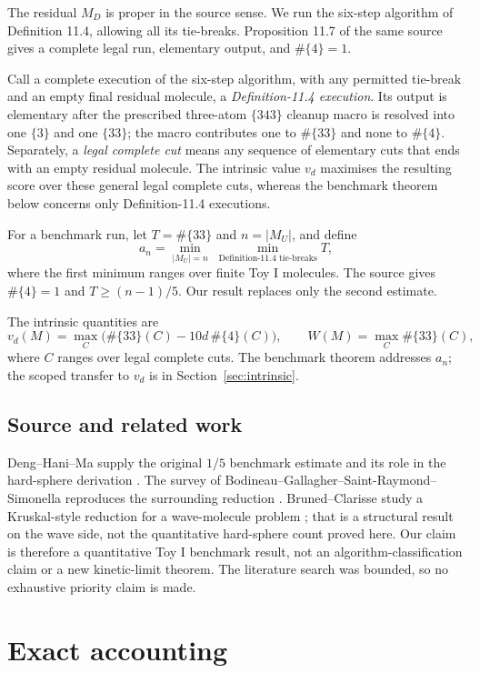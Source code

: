 \documentclass[12pt]{article}
\newcommand{\good}{\#\{33\}}
\newcommand{\bad}{\#\{4\}}
\newcommand{\MU}{M_U}
\newcommand{\MD}{M_D}
\begin{document}
The residual \(\MD\) is proper in the source sense.  We run the six-step
algorithm of Definition 11.4, allowing all its tie-breaks.  Proposition 11.7
of the same source gives a complete legal run, elementary output, and
\(\bad=1\).

Call a complete execution of the six-step algorithm, with any permitted
tie-break and an empty final residual molecule, a \emph{Definition-11.4
execution}.  Its output is elementary after the prescribed three-atom
\(\{343\}\) cleanup macro is resolved into one \(\{3\}\) and one \(\{33\}\);
the macro contributes one to \(\good\) and none to \(\bad\).  Separately, a
\emph{legal complete cut} means any sequence of
elementary cuts that ends with an empty residual molecule.  The intrinsic value
\(v_d\) maximises the resulting score over these general legal complete cuts,
whereas the benchmark theorem below concerns only Definition-11.4 executions.

For a benchmark run, let \(T=\good\) and \(n=|\MU|\), and define
\[
 a_n=\min_{|\MU|=n}\;\min_{\text{Definition-11.4 tie-breaks}} T,
\]
where the first minimum ranges over finite Toy I molecules.  The source gives
\(\bad=1\) and \(T\ge(n-1)/5\).  Our result replaces only the second estimate.

The intrinsic quantities are
\[
 v_d(M)=\max_C\bigl(\good(C)-10d\,\bad(C)\bigr),\qquad
 W(M)=\max_C\good(C),
\]
where \(C\) ranges over legal complete cuts.  The benchmark theorem addresses
\(a_n\); the scoped transfer to \(v_d\) is in Section~\ref{sec:intrinsic}.

\subsection{Source and related work}

Deng--Hani--Ma supply the original \(1/5\) benchmark estimate and its role in
the hard-sphere derivation \cite{DHM}.  The survey of
Bodineau--Gallagher--Saint-Raymond--Simonella reproduces the surrounding
reduction \cite{BGSS}.  Bruned--Clarisse study a Kruskal-style reduction for a
wave-molecule problem \cite{BC}; that is a structural result on the wave side,
not the quantitative hard-sphere count proved here.  Our claim is therefore a
quantitative Toy I benchmark result, not an algorithm-classification claim or
a new kinetic-limit theorem.  The literature search was bounded, so no
exhaustive priority claim is made.

\section{Exact accounting}
\end{document}
